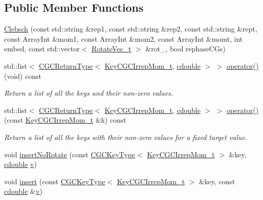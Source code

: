 \subsection*{Public Member Functions}
\begin{DoxyCompactItemize}
\item 
\mbox{\hyperlink{classHadron_1_1CGC_1_1CGCIrrepMomLGxLGtoLGEnv_1_1Clebsch_aec8b07c8384bf303329f17cac780ba25}{Clebsch}} (const std\+::string \&rep1, const std\+::string \&rep2, const std\+::string \&rept, const Array\+Int \&mom1, const Array\+Int \&mom2, const Array\+Int \&momt, int embed, const std\+::vector$<$ \mbox{\hyperlink{structHadron_1_1RotateVec__t}{Rotate\+Vec\+\_\+t}} $>$ \&rot\+\_\+, bool rephase\+C\+Gs)
\item 
std\+::list$<$ \mbox{\hyperlink{structHadron_1_1CGCReturnType}{C\+G\+C\+Return\+Type}}$<$ \mbox{\hyperlink{structHadron_1_1KeyCGCIrrepMom__t}{Key\+C\+G\+C\+Irrep\+Mom\+\_\+t}}, \mbox{\hyperlink{namespaceHadron_1_1CGC_a52d2b70e6792726fb525eab94daae53b}{cdouble}} $>$ $>$ \mbox{\hyperlink{classHadron_1_1CGC_1_1CGCIrrepMomLGxLGtoLGEnv_1_1Clebsch_a27a81332c929b1f421704680e794b796}{operator()}} (void) const
\begin{DoxyCompactList}\small\item\em Return a list of all the keys and their non-\/zero values. \end{DoxyCompactList}\item 
std\+::list$<$ \mbox{\hyperlink{structHadron_1_1CGCReturnType}{C\+G\+C\+Return\+Type}}$<$ \mbox{\hyperlink{structHadron_1_1KeyCGCIrrepMom__t}{Key\+C\+G\+C\+Irrep\+Mom\+\_\+t}}, \mbox{\hyperlink{namespaceHadron_1_1CGC_a52d2b70e6792726fb525eab94daae53b}{cdouble}} $>$ $>$ \mbox{\hyperlink{classHadron_1_1CGC_1_1CGCIrrepMomLGxLGtoLGEnv_1_1Clebsch_a8a003db7855154fba35df2485da43353}{operator()}} (const \mbox{\hyperlink{structHadron_1_1KeyCGCIrrepMom__t}{Key\+C\+G\+C\+Irrep\+Mom\+\_\+t}} \&k) const
\begin{DoxyCompactList}\small\item\em Return a list of all the keys with their non-\/zero values for a fixed target value. \end{DoxyCompactList}\item 
void \mbox{\hyperlink{classHadron_1_1CGC_1_1CGCIrrepMomLGxLGtoLGEnv_1_1Clebsch_a57c67efaf6fb826157a5c19a4066959e}{insert\+No\+Rotate}} (const \mbox{\hyperlink{structHadron_1_1CGCKeyType}{C\+G\+C\+Key\+Type}}$<$ \mbox{\hyperlink{structHadron_1_1KeyCGCIrrepMom__t}{Key\+C\+G\+C\+Irrep\+Mom\+\_\+t}} $>$ \&key, \mbox{\hyperlink{namespaceHadron_1_1CGC_a52d2b70e6792726fb525eab94daae53b}{cdouble}} \mbox{\hyperlink{hadron__timeslice_8cc_a716fc87f5e814be3ceee2405ed6ff22a}{v}})
\item 
void \mbox{\hyperlink{classHadron_1_1CGC_1_1CGCIrrepMomLGxLGtoLGEnv_1_1Clebsch_a4d4ec2ede98509ab49ac04fe23ef2ea8}{insert}} (const \mbox{\hyperlink{structHadron_1_1CGCKeyType}{C\+G\+C\+Key\+Type}}$<$ \mbox{\hyperlink{structHadron_1_1KeyCGCIrrepMom__t}{Key\+C\+G\+C\+Irrep\+Mom\+\_\+t}} $>$ \&key, const \mbox{\hyperlink{namespaceHadron_1_1CGC_a52d2b70e6792726fb525eab94daae53b}{cdouble}} \&\mbox{\hyperlink{hadron__timeslice_8cc_a716fc87f5e814be3ceee2405ed6ff22a}{v}})
\end{DoxyCompactItemize}


